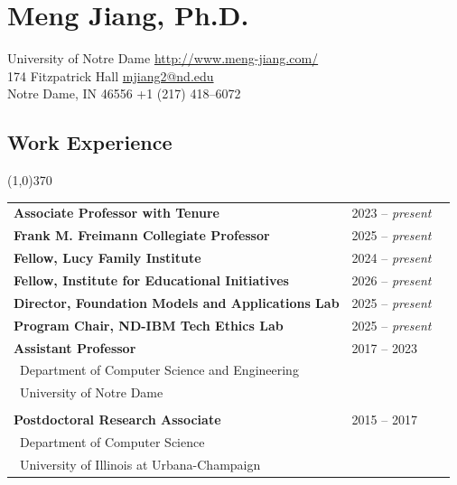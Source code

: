 \documentclass[10pt]{article}
\begin{document}
\setcounter{secnumdepth}{0}

\thispagestyle{firststyle}

\section{\LARGE{\sc Meng Jiang, Ph.D.}}
University of Notre Dame \hfill \url{http://www.meng-jiang.com/} \\
174 Fitzpatrick Hall \hfill \url{mjiang2@nd.edu}\\
Notre Dame, IN 46556 \hfill +1 (217) 418--6072

\subsection{\sc Work Experience}
\vspace{-0.4cm} \line(1,0){370} \vspace{0.1cm}

\begin{table}[h!]
\begin{tabular*}{12.7cm}{p{10.0cm}p{3.25cm}r}
\bf{Associate Professor with Tenure}&2023 -- \emph{present}\\
\bf{Frank M. Freimann Collegiate Professor}&2025 -- \emph{present}\\
\bf{Fellow, Lucy Family Institute}&2024 -- \emph{present}\\
\bf{Fellow, Institute for Educational Initiatives}&2026 -- \emph{present}\\
\bf{Director, Foundation Models and Applications Lab}&2025 -- \emph{present}\\
\bf{Program Chair, ND-IBM Tech Ethics Lab}&2025 -- \emph{present}\\
\bf{Assistant Professor}&2017 -- 2023\\
 \multicolumn{2}{l}{~{Department of Computer Science and Engineering}}\\
 \multicolumn{2}{l}{~{University of Notre Dame}}\\
\\
\bf{Postdoctoral Research Associate}&2015 -- 2017\\
 \multicolumn{2}{l}{~{Department of Computer Science}} \\
 \multicolumn{2}{l}{~{University of Illinois at Urbana-Champaign}}\\
\end{tabular*}
\end{table}
\vspace{-0.4cm}
\end{document}
